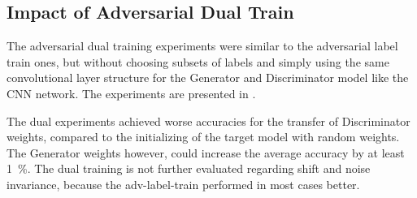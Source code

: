 \subsection{Impact of Adversarial Dual Train}
The adversarial dual training experiments were similar to the adversarial label train ones, but without choosing subsets of labels and simply using the same convolutional layer structure for the Generator and Discriminator model like the CNN network.
The experiments are presented in .

The dual experiments achieved worse accuracies for the transfer of Discriminator weights, compared to the initializing of the target model with random weights.
The Generator weights however, could increase the average accuracy by at least \SI{1}{\percent}.
The dual training is not further evaluated regarding shift and noise invariance, because the adv-label-train performed in most cases better.